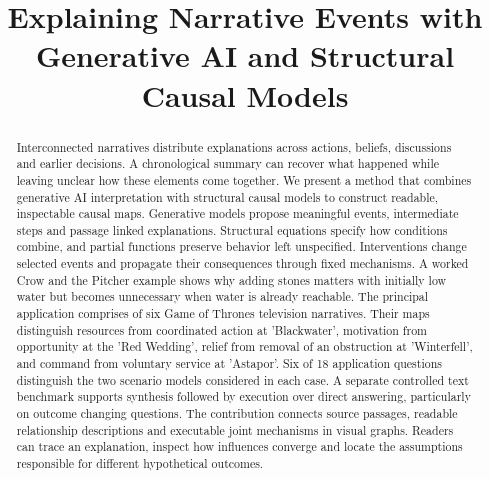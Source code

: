 \documentclass{svproc}
\begin{document}
\mainmatter
\raggedbottom
\title{Explaining Narrative Events with Generative AI and Structural Causal Models}
\author{}
\authorrunning{}
\institute{}
\maketitle

\begin{abstract}
Interconnected narratives distribute explanations across actions, beliefs, discussions and earlier decisions. A chronological summary can recover what happened while leaving unclear how these elements come together. We present a method that combines generative AI interpretation with structural causal models to construct readable, inspectable causal maps. Generative models propose meaningful events, intermediate steps and passage linked explanations. Structural equations specify how conditions combine, and partial functions preserve behavior left unspecified. Interventions change selected events and propagate their consequences through fixed mechanisms. A worked Crow and the Pitcher example shows why adding stones matters with initially low water but becomes unnecessary when water is already reachable. The principal application comprises of six Game of Thrones television narratives. Their maps distinguish resources from coordinated action at 'Blackwater', motivation from opportunity at the 'Red Wedding', relief from removal of an obstruction at 'Winterfell', and command from voluntary service at 'Astapor'. Six of 18 application questions distinguish the two scenario models considered in each case. A separate controlled text benchmark supports synthesis followed by execution over direct answering, particularly on outcome changing questions. The contribution connects source passages, readable relationship descriptions and executable joint mechanisms in visual graphs. Readers can trace an explanation, inspect how influences converge and locate the assumptions responsible for different hypothetical outcomes.
\end{abstract}
\end{document}
